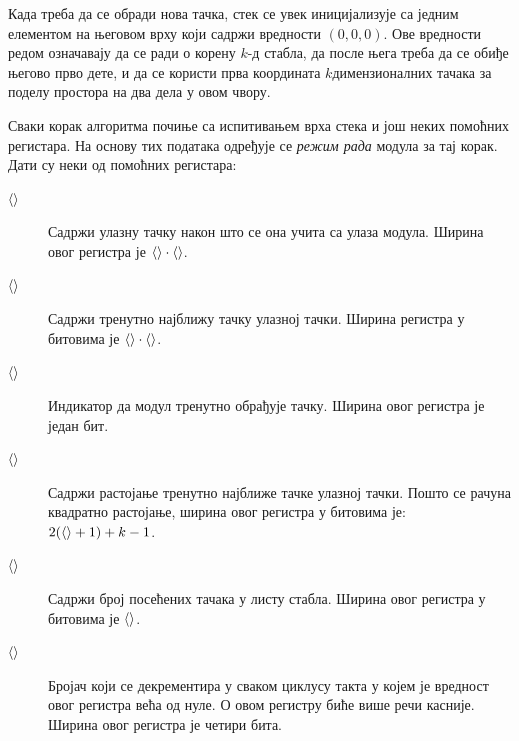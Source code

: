 \documentclass[master]{finthesis}
\newcommand*{\kdim}[1]{\texorpdfstring{$k$\Hyphdash}{k-}димензионал#1}
\newcommand*{\kd}{\texorpdfstring{$k$}{k}-д }
\newcommand*{\correctmath}[1]{%
    \ifcsname mathCorrectionFor#1\endcsname%
        \csname mathCorrectionFor#1\endcsname%
    \else%
        #1%
    \fi%
}
\newcommand*{\mfield}[1]{{\langle\correctmath{#1}\/\rangle}}
\newcommand*{\field}[1]{\texorpdfstring{$\mfield{#1}$}{⟨#1⟩}}
\begin{document}
Када треба да се обради нова тачка, стек се увек иницијализује са једним елементом на његовом врху који садржи вредности $(0, 0, 0)$. Ове вредности редом означавају да се ради о корену \kd стабла, да после њега треба да се обиђе његово прво дете, и да се користи прва координата \kdim{них} тачака за поделу простора на два дела у овом чвору.

Сваки корак алгоритма почиње са испитивањем врха стека и још неких помоћних регистара. На основу тих података одређује се \emph{режим рада} модула за тај корак. Дати су неки од помоћних регистара:
\begin{description}
    \item[\field{inPoint}] Садржи улазну тачку након што се она учита са улаза модула. Ширина овог регистра је $\mfield{pointNumDimensions} \cdot \mfield{pointElemWidth}$. 
    \item[\field{closestPoint}] Садржи тренутно најближу тачку улазној тачки. Ширина регистра у битовима је $\mfield{pointNumDimensions} \cdot \mfield{pointElemWidth}$.
    \item[\field{busy}] Индикатор да модул тренутно обрађује тачку. Ширина овог регистра је један бит.
    \item[\field{closesPointDist}] Садржи растојање тренутно најближе тачке улазној тачки. Пошто се рачуна квадратно растојање, ширина овог регистра у битовима је:\\$2 (\mfield{pointElemWidth} + 1) + k - 1$.
    \item[\field{iterPointsVisited}] Садржи број посећених тачака у листу стабла. Ширина овог регистра у битовима је $\mfield{pRomAddressWidth}$.
    \item[\field{closestPointDelay}] Бројач који се декрементира у сваком циклусу такта у којем је вредност овог регистра већа од нуле. О овом регистру биће више речи касније. Ширина овог регистра је четири бита.
\end{description}
\end{document}
